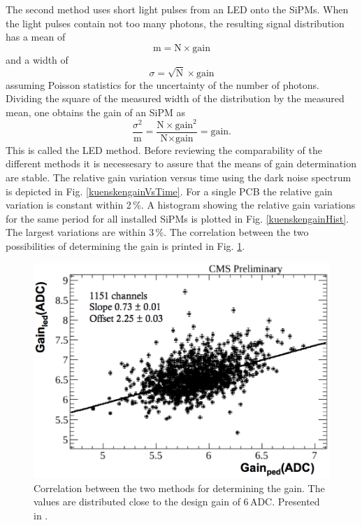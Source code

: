 The second method uses short light pulses from an LED onto the SiPMs. When the light pulses contain not too many photons, the resulting signal distribution has a mean of
\begin{equation}
\text{m}=\text{N}\times \text{gain}
\end{equation}
and a width of
\begin{equation}
\sigma=\sqrt{\text{N}}\times \text{gain}
\end{equation}
assuming Poisson statistics for the uncertainty of the number of photons. Dividing the square of the measured width of the distribution by the measured mean, one obtains the gain of an SiPM as
\begin{equation}
\frac{\sigma^2}{\text{m}}=\frac{\text{N}\times \text{gain}^2}{\text{N}\times \text{gain}}=\text{gain.}
\end{equation}
This is called the LED method.
Before reviewing the comparability of the different methods it is necessesary to assure that the means of gain determination are stable. The relative gain variation versus time using the dark noise
spectrum is depicted in Fig. \ref{kuenskengainVsTime}. For a single PCB the relative gain variation is constant within 2\,\%. A histogram showing the relative gain variations for the same period for all installed SiPMs is plotted in Fig. \ref{kuenskengainHist}. The largest variations are within 3\,\%. The correlation between the two possibilities of determining the gain is printed in Fig. \ref{kuenskengainCorr}.
\begin{figure}[htbp]
\centering
\begin{minipage}[b]{0.475\textwidth}
\includegraphics[width=\textwidth]{Figures/kuensken/gainCorrelation.png}
\end{minipage}
\hspace{0.5cm}
\begin{minipage}[b]{0.475\textwidth}
\caption{Correlation between the two methods for determining the gain. The values are distributed close to the design gain of 6\,ADC. Presented in \cite{kuenskenCalor}.}
\label{kuenskengainCorr}
\end{minipage}
\end{figure}
